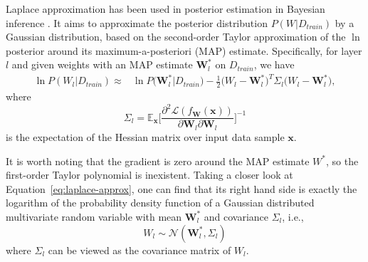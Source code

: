 Laplace approximation has been used in posterior estimation in Bayesian inference \cite{bishop2006pattern,ritter2018scalable}. It aims to approximate the posterior distribution 
$P(W | D_{train})$ by a Gaussian distribution, based on the second-order Taylor approximation of the $\ln$ posterior around its maximum-a-posteriori (MAP) estimate.
Specifically, for layer $l$ and given weights with an MAP estimate $\mathbf{W}_l^*$ on $D_{train}$, we have
\begin{equation}
\begin{aligned} \label{eq:laplace-approx}
   \ln P(W_l|D_{train}) \approx & \ln P\Big(\mathbf{W}_l^*|D_{train}\Big)-\frac{1}{2}\Big(W_l-\mathbf{W}_l^*\Big)^T\Sigma_{l} \Big(W_l-\mathbf{W}_l^*\Big),
\end{aligned}
\end{equation}
where $$\Sigma_{l}=\mathbb{E}_{\mathbf{x}}\Big[\frac{\partial^2 \mathcal{L}(f_{\mathbf{W}}(\mathbf{x}))}{\partial \mathbf{W}_l \partial \mathbf{W}_l}\Big]^{-1}$$ is the expectation of the Hessian matrix over input data sample $\mathbf{x}$.

It is worth noting that the gradient is zero around the MAP estimate $W^*$, so  the first-order Taylor polynomial is inexistent. Taking a closer look at Equation~\ref{eq:laplace-approx}, one can find that its right hand side is exactly the logarithm of the probability density function of a  Gaussian distributed multivariate random variable with mean ${\mathbf{W}_l^*}$ and covariance ${\Sigma_{l}}$, i.e., \begin{equation}W_l \sim \mathcal{N}(\mathbf{W}_l^*,\Sigma_{l})
\end{equation}
where $\Sigma_{l}$  can be viewed as the covariance matrix of $W_l$. 

